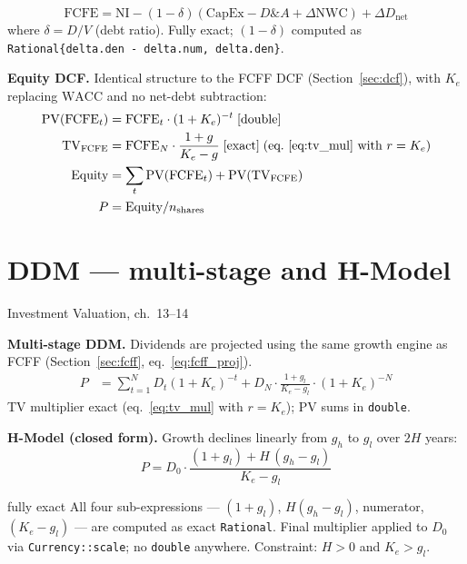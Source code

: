 \documentclass[11pt, a4paper, oneside]{article}
\newcommand{\FCFE}{\mathrm{FCFE}}
\newcommand{\WACC}{\mathrm{WACC}}
\newcommand{\TV}{\mathrm{TV}}
\newcommand{\Ke}{K_e}
\newcommand{\NWC}{\mathrm{NWC}}
\newcommand{\DA}{D\&A}
\newcommand{\exact}{\;\text{[exact]}}
\newcommand{\dbl}{\;\text{[double]}}
\begin{document}
\begin{equation}
  \FCFE = \mathrm{NI} - (1-\delta)(\mathrm{CapEx} - \DA + \Delta\NWC)
          + \Delta D_\text{net}
  \label{eq:fcfe}
\end{equation}
where $\delta = D/V$ (debt ratio). Fully exact; $(1-\delta)$ computed as
\texttt{Rational\{delta.den - delta.num, delta.den\}}.

\textbf{Equity DCF.} Identical structure to the FCFF DCF
(Section~\ref{sec:dcf}), with $\Ke$ replacing $\WACC$ and no
net-debt subtraction:
\begin{align}
  \mathrm{PV}(\FCFE_t) &= \FCFE_t \cdot (1+\Ke)^{-t} \dbl\\
  \TV_\text{FCFE} &= \FCFE_N \cdot \frac{1+g}{\Ke - g}
    \exact\;\text{(eq.~\ref{eq:tv_mul} with } r=\Ke\text{)}\\
  \text{Equity} &= \sum_t \mathrm{PV}(\FCFE_t) + \mathrm{PV}(\TV_\text{FCFE})\\
  P &= \text{Equity} / n_\text{shares}
\end{align}

\section{DDM --- multi-stage and H-Model}
\label{sec:ddm}

\begin{damodaran}{Investment Valuation, ch.~13--14}
\end{damodaran}

\textbf{Multi-stage DDM.} Dividends are projected using the same growth
engine as FCFF (Section~\ref{sec:fcff}, eq.~\ref{eq:fcff_proj}).
\begin{align}
  P &= \sum_{t=1}^{N} D_t (1+\Ke)^{-t}
       + D_N \cdot \frac{1+g_l}{\Ke - g_l} \cdot (1+\Ke)^{-N}
\end{align}
TV multiplier exact (eq.~\ref{eq:tv_mul} with $r=\Ke$); PV sums in
\texttt{double}.

\textbf{H-Model (closed form).}
Growth declines linearly from $g_h$ to $g_l$ over $2H$ years:
\begin{equation}
  P = D_0 \cdot \frac{(1+g_l) + H\,(g_h - g_l)}{\Ke - g_l}
  \label{eq:hmodel}
\end{equation}

\begin{impl}{fully exact}
All four sub-expressions --- $(1+g_l)$, $H(g_h-g_l)$, numerator, $(\Ke-g_l)$ ---
are computed as exact \texttt{Rational}. Final multiplier applied to $D_0$ via
\texttt{Currency::scale}; no \texttt{double} anywhere.
Constraint: $H > 0$ and $\Ke > g_l$.
\end{impl}
\end{document}
